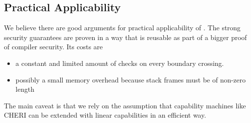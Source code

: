 \documentclass[acmsmall,screen]{acmart}\settopmatter{}
\newcommand{\trgcm}{\textsc{LCM}}
\newcommand{\srccm}{\textsc{oLCM}}
\begin{document}



\subsection{Practical Applicability}
We believe there are good arguments for practical applicability of \stktokens{}.
The strong security guarantees are proven in a way that is reusable as part of a bigger proof of compiler security.
Its costs are
\begin{itemize}
\item a constant and limited amount of checks on every boundary crossing.
\item possibly a small memory overhead because stack frames must be of non-zero length
\end{itemize}
The main caveat is that we rely on the assumption that capability machines like CHERI can be extended with linear capabilities in an efficient way.
\end{document}

